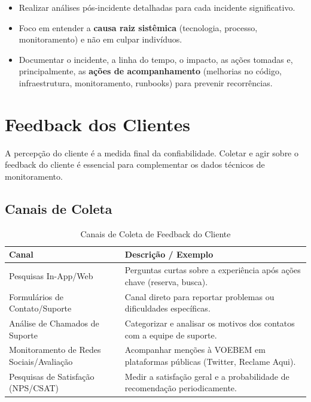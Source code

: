 \begin{itemize}
\begin{itemize}
\begin{itemize}
                    \item Realizar análises pós-incidente detalhadas para cada incidente significativo.
                    \item Foco em entender a \textbf{causa raiz sistêmica} (tecnologia, processo, monitoramento) e não em culpar indivíduos.
                    \item Documentar o incidente, a linha do tempo, o impacto, as ações tomadas e, principalmente, as \textbf{ações de acompanhamento} (melhorias no código, infraestrutura, monitoramento, runbooks) para prevenir recorrências.
                \end{itemize}
        \end{itemize}
\end{itemize}

\section{Feedback dos Clientes}
\label{sec:feedback-clientes}

A percepção do cliente é a medida final da confiabilidade. Coletar e agir sobre o feedback do cliente é essencial para complementar os dados técnicos de monitoramento.

\subsection{Canais de Coleta}
\label{subsec:canais-coleta}

\begin{table}[htbp]
    \centering
    \caption{Canais de Coleta de Feedback do Cliente}
    \label{tab:canais-coleta}
    \begin{tabularx}{\textwidth}{lX} %
        \toprule
        \textbf{Canal} & \textbf{Descrição / Exemplo} \\
        \midrule
        Pesquisas In-App/Web & Perguntas curtas sobre a experiência após ações chave (reserva, busca). \\
        Formulários de Contato/Suporte & Canal direto para reportar problemas ou dificuldades específicas. \\
        Análise de Chamados de Suporte & Categorizar e analisar os motivos dos contatos com a equipe de suporte. \\
        Monitoramento de Redes Sociais/Avaliação & Acompanhar menções à VOEBEM em plataformas públicas (Twitter, Reclame Aqui). \\
        Pesquisas de Satisfação (NPS/CSAT) & Medir a satisfação geral e a probabilidade de recomendação periodicamente. \\
        \bottomrule
    \end{tabularx}
\end{table}

